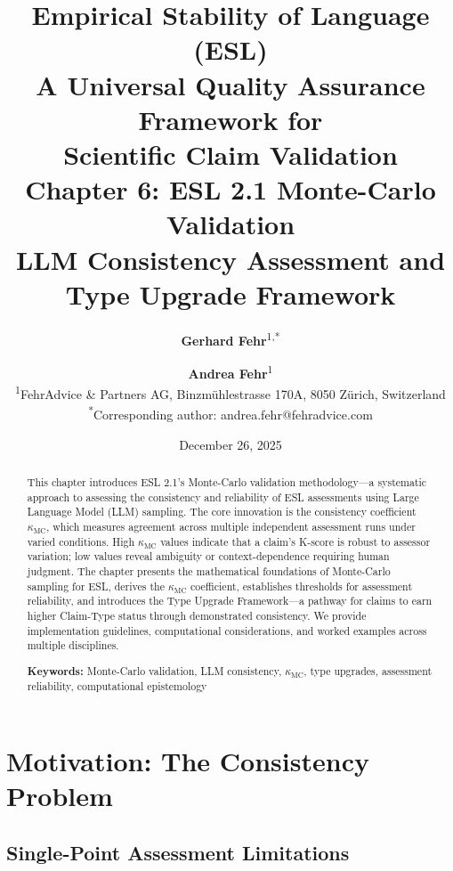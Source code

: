 \documentclass[11pt,a4paper]{article}
\title{%
    \Large \textbf{Empirical Stability of Language (ESL)} \\[0.5em]
    \large A Universal Quality Assurance Framework for \\
    Scientific Claim Validation \\[1em]
    \LARGE \textbf{Chapter 6: ESL 2.1 Monte-Carlo Validation} \\[0.3em]
    \large LLM Consistency Assessment and Type Upgrade Framework
}
\author{%
    \textbf{Gerhard Fehr}\textsuperscript{1,*} \and \textbf{Andrea Fehr}\textsuperscript{1} \\[0.5em]
    \textsuperscript{1}FehrAdvice \& Partners AG, Binzmühlestrasse 170A, 8050 Zürich, Switzerland \\[0.3em]
    \textsuperscript{*}Corresponding author: andrea.fehr@fehradvice.com
}
\date{December 26, 2025}
\theoremstyle{remark}
\begin{document}
\maketitle


\begin{abstract}
\noindent
This chapter introduces ESL 2.1's Monte-Carlo validation methodology---a systematic approach to assessing the consistency and reliability of ESL assessments using Large Language Model (LLM) sampling. The core innovation is the consistency coefficient $\kappa_{\text{MC}}$, which measures agreement across multiple independent assessment runs under varied conditions. High $\kappa_{\text{MC}}$ values indicate that a claim's K-score is robust to assessor variation; low values reveal ambiguity or context-dependence requiring human judgment. The chapter presents the mathematical foundations of Monte-Carlo sampling for ESL, derives the $\kappa_{\text{MC}}$ coefficient, establishes thresholds for assessment reliability, and introduces the Type Upgrade Framework---a pathway for claims to earn higher Claim-Type status through demonstrated consistency. We provide implementation guidelines, computational considerations, and worked examples across multiple disciplines.

\vspace{0.5em}
\noindent\textbf{Keywords:} Monte-Carlo validation, LLM consistency, $\kappa_{\text{MC}}$, type upgrades, assessment reliability, computational epistemology
\end{abstract}

\tableofcontents
\newpage


\section{Motivation: The Consistency Problem}
\label{sec:motivation}

\subsection{Single-Point Assessment Limitations}
\end{document}
